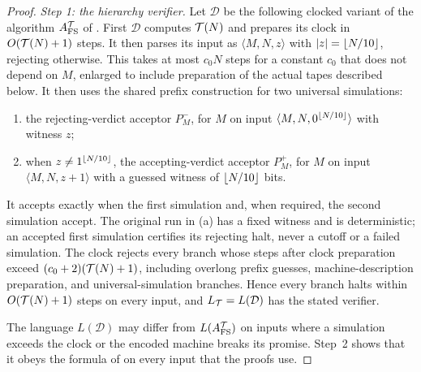 \begin{proof}
\emph{Step 1: the hierarchy verifier.} Let \(\mathcal D\) be the following
clocked variant of the algorithm \(A^{\mathcal T}_{\rm FS}\) of
\cite[Definition~4.2]{CLW20}. First \(\mathcal D\) computes \(\mathcal T(N)\)
and prepares its clock in \(O(\mathcal T(N)+1)\) steps.
It then parses its input as \(\langle M,N,z\rangle\) with
\(\left|z\right|=\left\lfloor N/10\right\rfloor\), rejecting otherwise. This takes at most \(c_0N\)
steps for a constant \(c_0\) that does not depend on \(M\), enlarged
to include preparation of the actual tapes described below. It then
uses the shared prefix construction for two universal simulations:
\begin{enumerate}[label=(\alph*)]
\item the rejecting-verdict acceptor \(P_M^-\), for \(M\) on input
\(\langle M,N,0^{\left\lfloor N/10\right\rfloor}\rangle\) with witness \(z\);
\item when \(z\ne1^{\left\lfloor N/10\right\rfloor}\), the accepting-verdict acceptor
\(P_M^+\), for \(M\) on input
\(\langle M,N,z+1\rangle\) with a guessed witness of \(\left\lfloor N/10\right\rfloor\)
bits.
\end{enumerate}
It accepts exactly when the first simulation and, when required, the
second simulation accept. The original run in (a) has a fixed witness
and is deterministic; an accepted first simulation certifies its
rejecting halt, never a cutoff or a failed simulation. The clock
rejects every branch whose steps after clock preparation exceed
\((c_0+2)(\mathcal T(N)+1)\), including overlong prefix guesses,
machine-description preparation, and universal-simulation branches.
Hence every branch halts within \(O(\mathcal T(N)+1)\) steps on every
input, and \(L_{\mathcal T}=L(\mathcal D)\) has the stated verifier.

The language \(L(\mathcal D)\) may differ from \(L(A^{\mathcal T}_{\rm FS})\)
on inputs where a simulation exceeds the clock or the encoded machine
breaks its promise. Step~2 shows that it obeys the formula of
\cite[Lemma~4.3]{CLW20} on every input that the proofs use.


\end{proof}
